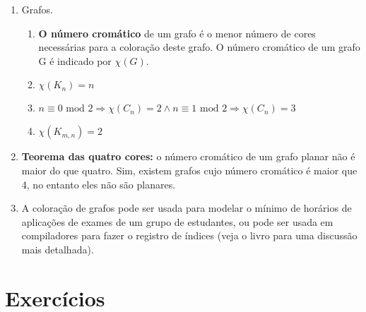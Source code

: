 \documentclass{article}
\begin{document}
\begin{enumerate}
	\item Grafos.
	      \begin{enumerate}

		      \item \textbf{O número cromático} de um grafo é o menor número de cores necessárias para a coloração deste grafo. O número cromático de um grafo G é indicado por \( \chi (G) \).

		      \item \( \chi (K_n) = n \)

		      \item \( n \equiv 0 \textrm{ mod } 2 \Rightarrow \chi (C_n) = 2 \land n \equiv 1 \textrm{ mod } 2 \Rightarrow \chi (C_n) = 3\)

		      \item \( \chi (K_{m,n}) = 2 \)

	      \end{enumerate}

	\item \textbf{Teorema das quatro cores:} o número cromático de um grafo planar não é maior do que quatro. Sim, existem grafos cujo número cromático é maior que 4, no entanto eles não são planares.

	\item A coloração de grafos pode ser usada para modelar o mínimo de horários de aplicações de exames de um grupo de estudantes, ou pode ser usada em compiladores para fazer o registro de índices (veja o livro para uma discussão mais detalhada).


\end{enumerate}

\section*{Exercícios}
\end{document}
